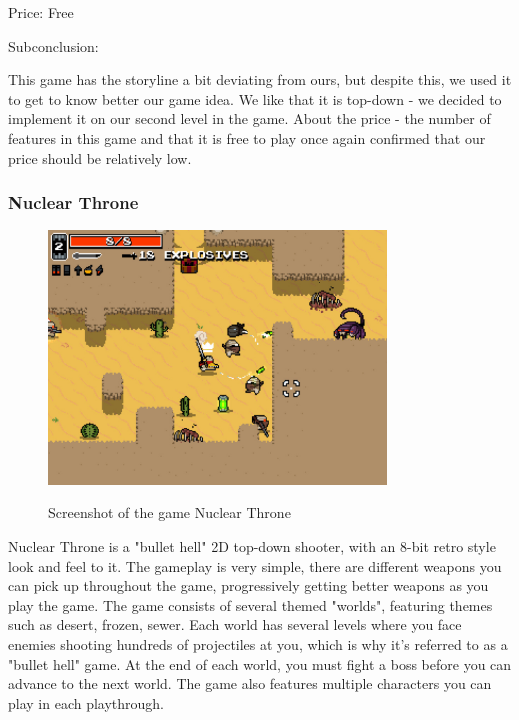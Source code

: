 \documentclass[12p]{article}
\begin{document}
Price: Free

Subconclusion:

This game has the storyline a bit deviating from ours, but despite this, we used it to get to know better our game idea. We like that it is top-down - we decided to implement it on our second level in the game. About the price - the number of features in this game and that it is free to play once again confirmed that our price should be relatively low.


\newpage
\subsubsection[Nuclear Throne]{Nuclear Throne \cite{NulcearThrone}}

\begin{figure}[ht]
  \center
  \includegraphics[width=0.8\textwidth]{StateOfTheArtScreenshots/nuclearthrone}
  \label{sec:StateOfTheArt_Screenshots_Nulcearthrone}
  \caption{Screenshot of the game Nuclear Throne \cite{NulcearThroneScreenshot}}
\end{figure}

Nuclear Throne is a "bullet hell" 2D top-down shooter, with an 8-bit retro style look and feel to it. The gameplay is very simple, there are different weapons you can pick up throughout the game, progressively getting better weapons as you play the game. The game consists of several themed "worlds", featuring themes such as desert, frozen, sewer. Each world has several levels where you face enemies shooting hundreds of projectiles at you, which is why it's referred to as a "bullet hell" game. At the end of each world, you must fight a boss before you can advance to the next world. The game also features multiple characters you can play in each playthrough.
\end{document}

